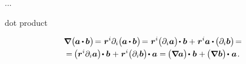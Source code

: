 ...

 dot product 

\nopagebreak\vspace{-0.4em}\begin{multline}\label{gradientofdotproductoftwovectors}
\boldnabla \hspace{.1ex} \bigl( \hspace{-0.05ex} \bm{a} \hspace{-0.1ex} \dotp \hspace{-0.1ex} \bm{b} \hspace{.05ex} \bigr) \hspace{-0.3ex}
= \hspace{.1ex} \locationvector^i \partial_i \bigl( \hspace{-0.05ex} \bm{a} \hspace{-0.1ex} \dotp \hspace{-0.1ex} \bm{b} \hspace{.05ex} \bigr) \hspace{-0.33ex}
= \hspace{.1ex} \locationvector^i \bigl( \partial_i \bm{a} \bigr) \hspace{-0.32ex} \dotp \bm{b} + \hspace{.1ex} \locationvector^i \bm{a} \hspace{-0.05ex} \dotp \hspace{-0.15ex} \bigl( \partial_i \bm{b} \bigr)  \hspace{-0.33ex} =
\\[-0.1em]
%
= \hspace{-0.2ex} \bigl( \locationvector^i \partial_i \bm{a} \bigr) \hspace{-0.32ex} \dotp \bm{b} \hspace{.1ex} + \hspace{.1ex} \locationvector^i \bigl( \partial_i \bm{b} \bigr) \hspace{-0.33ex} \dotp \bm{a}
= \hspace{-0.16ex} \bigl( \boldnabla \hspace{-0.1ex} \bm{a} \bigr) \hspace{-0.3ex} \dotp \hspace{.1ex} \bm{b} \hspace{.1ex} + \hspace{-0.1ex} \bigl( \boldnabla \hspace{.1ex} \bm{b} \bigr) \hspace{-0.27ex} \dotp \hspace{.1ex} \bm{a}
\hspace{.2ex} .
\end{multline}

